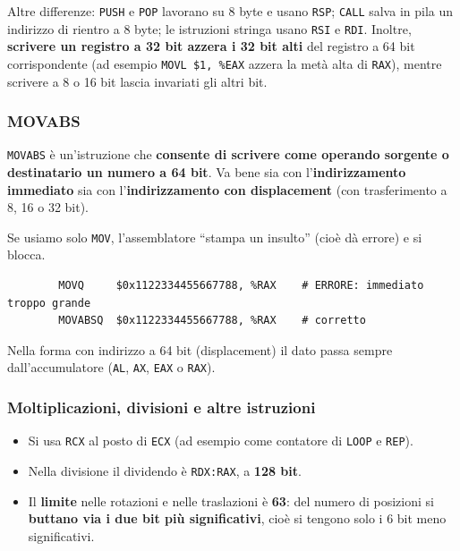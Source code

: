 \documentclass[11pt,a4paper]{article}
\begin{document}
\begin{integrazione}
Altre differenze: \texttt{PUSH} e \texttt{POP} lavorano su 8 byte e usano \texttt{RSP}; \texttt{CALL} salva in pila un indirizzo di rientro a 8 byte; le istruzioni stringa usano \texttt{RSI} e \texttt{RDI}. Inoltre, \textbf{scrivere un registro a 32 bit azzera i 32 bit alti} del registro a 64 bit corrispondente (ad esempio \texttt{MOVL \$1, \%EAX} azzera la metà alta di \texttt{RAX}), mentre scrivere a 8 o 16 bit lascia invariati gli altri bit.
\end{integrazione}

\subsubsection*{MOVABS}

\texttt{MOVABS} è un'istruzione che \textbf{consente di scrivere come operando sorgente o destinatario un numero a 64 bit}. Va bene sia con l'\textbf{indirizzamento immediato} sia con l'\textbf{indirizzamento con displacement} (con trasferimento a 8, 16 o 32 bit).

Se usiamo solo \texttt{MOV}, l'assemblatore ``stampa un insulto'' (cioè dà errore) e si blocca.

\begin{integrazione}
\begin{lstlisting}
        MOVQ     $0x1122334455667788, %RAX    # ERRORE: immediato troppo grande
        MOVABSQ  $0x1122334455667788, %RAX    # corretto
\end{lstlisting}
Nella forma con indirizzo a 64 bit (displacement) il dato passa sempre dall'accumulatore (\texttt{AL}, \texttt{AX}, \texttt{EAX} o \texttt{RAX}).
\end{integrazione}

\subsubsection*{Moltiplicazioni, divisioni e altre istruzioni}

\begin{itemize}[leftmargin=*]
  \item Si usa \texttt{RCX} al posto di \texttt{ECX} (ad esempio come contatore di \texttt{LOOP} e \texttt{REP}).
  \item Nella divisione il dividendo è \texttt{RDX:RAX}, a \textbf{128 bit}.
  \item Il \textbf{limite} nelle rotazioni e nelle traslazioni è \textbf{63}: del numero di posizioni si \textbf{buttano via i due bit più significativi}, cioè si tengono solo i 6 bit meno significativi.
\end{itemize}
\end{document}
